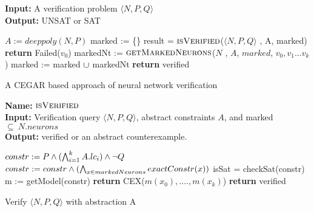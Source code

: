 \begin{algorithm}[t]
  \textbf{Input: } A verification problem $\langle N,P,Q \rangle$ \\
  \textbf{Output: } UNSAT or SAT
  \begin{algorithmic}[1]
    \State $A := deeppoly(N,P)$
    \State marked := \{\}
      \State result = $\textsc{isVerified}$($\langle N,P,Q \rangle$ , A, marked)
          \State \textbf{return} Failed(${v_0}$)
        \Else
        \State markedNt := $\textsc{getMarkedNeurons}$($N$ , $A$, $marked$, ${v_0}, {v_1} ... {v_k}$)
          \State marked := marked ${\cup}$ markedNt
        \EndIf
      \Else
        \State \textbf{return} verified
      \EndIf
    \EndWhile
  \end{algorithmic}
  \caption{A CEGAR based approach of neural network verification}
  \label{algo:main}
\end{algorithm}
\begin{algorithm}[t]
  \textbf{Name: } $\textsc{isVerified}$ \\
  \textbf{Input: } Verification query $\langle N,P,Q \rangle$, abstract constraints $A$, and marked $\subseteq ~ N.neurons$ \\
  \textbf{Output: } verified or an abstract counterexample. 
  \begin{algorithmic}[1]
    \State $constr := P \land (\bigwedge_{i=1}^k A.lc_i)\land \neg Q$
    \State $constr := constr \land (\bigwedge_{x \in markedNeurons} exactConstr(x))$ 
    \State isSat = checkSat(constr)
      \State m := getModel(constr)
      \State \textbf{return} CEX($m(x_0),....,m(x_k)$)
    \Else
      \State \textbf{return} verified
    \EndIf
  \end{algorithmic}
  \caption{Verify $\langle N,P,Q \rangle$ with abstraction A}
  \label{algo:verif1}
\end{algorithm}


